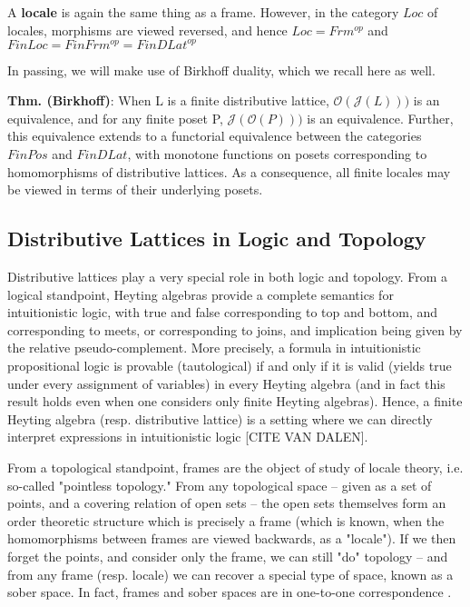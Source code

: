 \documentclass[hoptionsi,review,format=acmsmall]{acmart}
\theoremstyle{definition}
\newcommand{\Oc}{\mathcal{O}}
\newcommand{\Jc}{\mathcal{J}}
\begin{document}
A \textbf{locale} is again the same thing as a frame. However, in the category \(Loc\) of locales, morphisms are viewed reversed, and hence \(Loc = Frm^{op}\) and \(FinLoc = FinFrm^{op} = FinDLat^{op}\)

In passing, we will make use of Birkhoff duality, which we recall here as well.

\textbf{Thm. (Birkhoff)}: When L is a finite distributive lattice, \(\Oc(\Jc(L)))\) is an equivalence, and for any finite poset P,  \(\Jc(\Oc(P)))\) is an equivalence. Further, this equivalence extends to a functorial equivalence between the categories \(FinPos\) and \(FinDLat\), with monotone functions on posets corresponding to homomorphisms of distributive lattices. As a consequence, all finite locales may be viewed in terms of their underlying posets.

\subsection{Distributive Lattices in Logic and Topology}

Distributive lattices play a very special role in both logic and topology. From a logical standpoint, Heyting algebras provide a complete semantics for intuitionistic logic, with true and false corresponding to top and bottom, and corresponding to meets, or corresponding to joins, and implication being given by the relative pseudo-complement. More precisely, a formula in intuitionistic propositional logic is provable (tautological) if and only if it is valid (yields true under every assignment of variables) in every Heyting algebra (and in fact this result holds even when one considers only finite Heyting algebras). Hence, a finite Heyting algebra (resp. distributive lattice) is a setting where we can directly interpret expressions in intuitionistic logic [CITE VAN DALEN].

From a topological standpoint, frames are the object of study of locale theory, i.e. so-called "pointless topology." From any topological space -- given as a set of points, and a covering relation of open sets -- the open sets themselves form an order theoretic structure which is precisely a frame (which is known, when the homomorphisms between frames are viewed backwards, as a "locale"). If we then forget the points, and consider only the frame, we can still "do" topology -- and from any frame (resp. locale) we can recover a special type of space, known as a sober space. In fact, frames and sober spaces are in one-to-one correspondence \cite{johnstone1982stone, vickers1996topology}.
\end{document}
